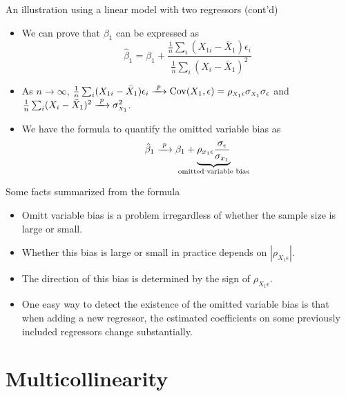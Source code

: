 \documentclass[presentation,10pt]{beamer}
\newcommand{\cov}{\mathrm{Cov}}
\newcommand{\rarrowd}[1]{\xrightarrow{\text{ \textit #1 }}}
\begin{document}
\begin{frame}[label={sec:org671f10e}]{An illustration using a linear model with two regressors (cont'd)}
\begin{itemize}
\item We can prove that \(\beta_1\) can be expressed as
\[ \hat{\beta}_1 = \beta_1 + \frac{\frac{1}{n}\sum_i
  (X_{1i} - \bar{X}_1) \epsilon_i}{\frac{1}{n}\sum_i (X_i - \bar{X}_1)^2} \]

\item As \(n \rightarrow \infty\), \(\frac{1}{n}\sum_i
  (X_{1i} - \bar{X}_1) \epsilon_i \rarrowd{p} \cov(X_1, \epsilon) = \rho_{{\scriptscriptstyle X_1} \epsilon} \sigma_{\scriptscriptstyle X_1} \sigma_{\epsilon}\)
and \(\frac{1}{n}\sum_i (X_i - \bar{X}_1)^2 \rarrowd{p}
  \sigma^2_{\scriptscriptstyle X_1}\).

\item We have the formula to quantify the omitted variable bias as
\begin{equation}
\label{eq:omb-4}
\hat{\beta}_1 \rarrowd{p} \beta_1 + \underbrace{\rho_{x_1 \epsilon} \frac{\sigma_{\epsilon}}{\sigma_{x_1}}}_{\mathclap{\text{omitted variable bias}}}
\end{equation}
\end{itemize}
\end{frame}

\begin{frame}[label={sec:org6dc0319}]{Some facts summarized from the formula}
\begin{itemize}
\item Omitt variable bias is a problem irregardless of whether the sample
size is large or small.

\item Whether this bias is large or small in practice depends on
\(|\rho_{X_{1} \epsilon}|\).

\item The direction of this bias is determined by the sign of \(\rho_{X_{1}
  \epsilon}\).

\item One easy way to detect the existence of the omitted variable bias is
that when adding a new regressor, the estimated coefficients on some
previously included regressors change substantially.
\end{itemize}
\end{frame}

\section{Multicollinearity}
\label{sec:org235f4c3}
\setcounter{tocdepth}{1}
\tableofcontents[currentsection]
\end{document}
